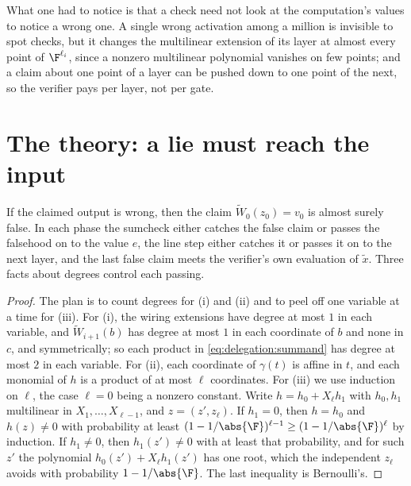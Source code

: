 \begin{refsection}
What one had to notice is that a check need not look at the computation's values to notice a wrong one. A single wrong activation among a million is invisible to spot checks, but it changes the multilinear extension of its layer at almost every point of $\F^{\ell_i}$, since a nonzero multilinear polynomial vanishes on few points; and a claim about one point of a layer can be pushed down to one point of the next, so the verifier pays per layer, not per gate.

\section{The theory: a lie must reach the input}\label{sec:delegation:theory}

If the claimed output is wrong, then the claim $\tilde W_0(z_0)=v_0$ is almost surely false. In each phase the sumcheck either catches the false claim or passes the falsehood on to the value $e$, the line step either catches it or passes it on to the next layer, and the last false claim meets the verifier's own evaluation of $\tilde x$. Three facts about degrees control each passing.


\begin{proof}
The plan is to count degrees for (i) and (ii) and to peel off one variable at a time for (iii). For (i), the wiring extensions have degree at most $1$ in each variable, and $\tilde W_{i+1}(b)$ has degree at most $1$ in each coordinate of $b$ and none in $c$, and symmetrically; so each product in \eqref{eq:delegation:summand} has degree at most $2$ in each variable. For (ii), each coordinate of $\gamma(t)$ is affine in $t$, and each monomial of $h$ is a product of at most $\ell$ coordinates. For (iii) we use induction on $\ell$, the case $\ell=0$ being a nonzero constant. Write $h=h_0+X_\ell h_1$ with $h_0,h_1$ multilinear in $X_1,\dots,X_{\ell-1}$, and $z=(z',z_\ell)$. If $h_1=0$, then $h=h_0$ and $h(z)\ne0$ with probability at least $(1-1/\abs{\F})^{\ell-1}\ge(1-1/\abs{\F})^\ell$ by induction. If $h_1\ne0$, then $h_1(z')\ne0$ with at least that probability, and for such $z'$ the polynomial $h_0(z')+X_\ell h_1(z')$ has one root, which the independent $z_\ell$ avoids with probability $1-1/\abs{\F}$. The last inequality is Bernoulli's.
\end{proof}


\end{refsection}
